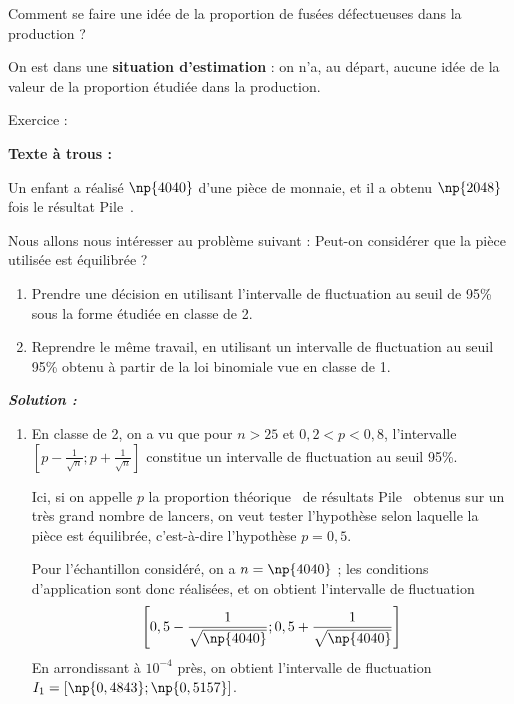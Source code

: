 \documentclass[12pt,french]{book}
\begin{document}
\begin{spacing}{1.2}
\begin{enumerate}
Comment se faire une idée de la proportion de fusées défectueuses dans la production ?

On est dans une \textbf{situation d'estimation} : on n'a, au départ, aucune idée de la valeur de la proportion étudiée dans la production.
\end{enumerate}

\medskip


\begin{bclogo}[couleur = blue!30 , arrondi = 0.1 ,logo = \bclampe , barre = snake , tailleOndu = 1.5]{Exercice :}


\textbf{Texte à trous :}

Un enfant a réalisé $\np{4040}$  d'une pièce de monnaie, et il a obtenu $\np{2048}$ fois le résultat \og Pile\fg~.

Nous allons nous intéresser au problème suivant : \og Peut-on considérer que la pièce utilisée est équilibrée ?\fg~

\begin{enumerate}
\item Prendre une décision en utilisant l'intervalle de fluctuation au seuil de 95\% sous la forme étudiée en classe de 2.
\item Reprendre le même travail, en utilisant un intervalle de fluctuation au seuil 95\% obtenu à partir de la loi binomiale vue en classe de 1.
\end{enumerate}
\end{bclogo}


\newpage

\textbf{\textit{Solution :}}

\begin{enumerate}
\item En classe de 2, on a vu que pour $n>25$ et $0,2<p<0,8$, l'intervalle $\left[p-\frac{1}{\sqrt{n}};p+\frac{1}{\sqrt{n}}\right]$ constitue un intervalle de fluctuation au seuil 95\%.

Ici, si on appelle $p$ la \og proportion théorique\fg~ de résultats \og Pile\fg~ obtenus sur un très grand nombre de lancers, on veut tester l'hypothèse selon laquelle la pièce est équilibrée, c'est-à-dire l'hypothèse $p=0,5$.

Pour l'échantillon considéré, on a $n=\np{4040}$ ; les conditions d'application sont donc réalisées, et on obtient l'intervalle de fluctuation 
\[\left[0,5-\frac{1}{\sqrt{\np{4040}}};0,5+\frac{1}{\sqrt{\np{4040}}}\right]\]
En arrondissant à $10^{-4}$ près, on obtient l'intervalle de fluctuation $I_1=[\np{0,4843};\np{0,5157}]$.


\end{enumerate}
\end{spacing}
\end{document}
